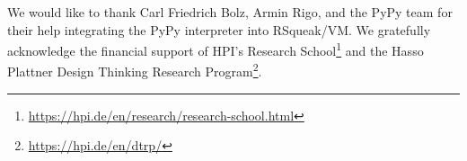 \documentclass[sigconf,english]{acmart}
\begin{document}
\begin{acks}
We would like to thank Carl Friedrich Bolz, Armin Rigo, and the PyPy team for
their help integrating the PyPy interpreter into RSqueak/VM.
We gratefully acknowledge the financial support of HPI's Research
School\footnote{\url{https://hpi.de/en/research/research-school.html}} and the Hasso
Plattner Design Thinking Research Program\footnote{\url{https://hpi.de/en/dtrp/}}.
\end{acks}



\end{document}
